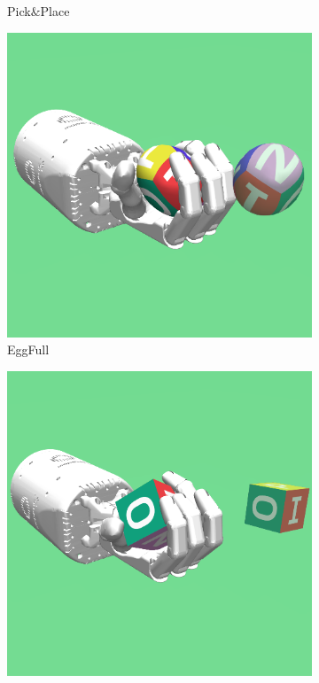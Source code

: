 \begin{figure}
\begin{subfigure}[t]{0.19\textwidth}
    \caption{Pick$\&$Place}
    \label{subfig:env_pick}
  \end{subfigure}\hfill
  \begin{subfigure}[t]{0.19\textwidth}
    \includegraphics[width=\textwidth]{figures/chapter4/handegg_resize.png}
    \caption{EggFull}
    \label{subfig:env_handegg}
  \end{subfigure}\hfill
  \begin{subfigure}[t]{0.19\textwidth}
    \includegraphics[width=\textwidth]{figures/chapter4/handblock_resize.png}

\end{subfigure}
\end{figure}
